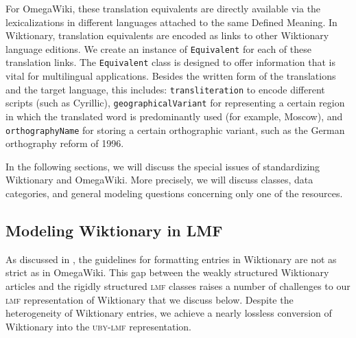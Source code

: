\documentclass[output=paper]{LSP/langsci}
\begin{document}
For OmegaWiki, these translation equivalents are directly available via the lexicalizations in different languages attached to the same Defined Meaning. In Wiktionary, translation equivalents are encoded as links to other Wiktionary language editions. We create an instance of \texttt{Equivalent} for each of these translation links. The \texttt{Equivalent} class is designed to offer information that is vital for multilingual applications. Besides the written form of the translations and the target language, this includes: \texttt{transliteration} to encode different scripts (such as Cyrillic), \texttt{geographicalVariant} for representing a certain region in which the translated word is predominantly used (for example, Moscow), and \texttt{orthographyName} for storing a certain orthographic variant, such as the German orthography reform of 1996.

In the following sections, we will discuss the special issues of standardizing Wiktionary and OmegaWiki. More precisely, we will discuss classes, data categories, and general modeling questions concerning only one of the resources.

\subsection{Modeling Wiktionary in LMF}

As discussed in , the guidelines for formatting entries in Wiktionary are not as strict as in OmegaWiki. 
This gap between the weakly structured Wiktionary articles and the rigidly structured \textsc{lmf} classes raises a number of challenges to our \textsc{lmf} representation of Wiktionary that we discuss below. Despite the heterogeneity of Wiktionary entries, we achieve a nearly lossless conversion of Wiktionary into the \textsc{uby-lmf} representation.
\end{document}
